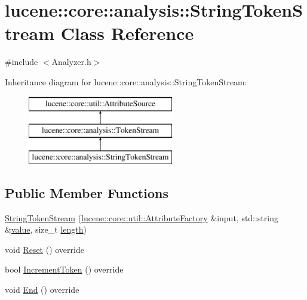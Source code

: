 \hypertarget{classlucene_1_1core_1_1analysis_1_1StringTokenStream}{}\section{lucene\+:\+:core\+:\+:analysis\+:\+:String\+Token\+Stream Class Reference}
\label{classlucene_1_1core_1_1analysis_1_1StringTokenStream}


{\ttfamily \#include $<$Analyzer.\+h$>$}

Inheritance diagram for lucene\+:\+:core\+:\+:analysis\+:\+:String\+Token\+Stream\+:\begin{figure}[H]
\begin{center}
\leavevmode
\includegraphics[height=3.000000cm]{classlucene_1_1core_1_1analysis_1_1StringTokenStream}
\end{center}
\end{figure}
\subsection*{Public Member Functions}
\begin{DoxyCompactItemize}
\item 
\mbox{\hyperlink{classlucene_1_1core_1_1analysis_1_1StringTokenStream_a413ff02bcf7a9f2d617f9e25021f9a44}{String\+Token\+Stream}} (\mbox{\hyperlink{classlucene_1_1core_1_1util_1_1AttributeFactory}{lucene\+::core\+::util\+::\+Attribute\+Factory}} \&input, std\+::string \&\mbox{\hyperlink{classlucene_1_1core_1_1analysis_1_1StringTokenStream_a6fb3e249a092b3cd9b008449d256b6a8}{value}}, size\+\_\+t \mbox{\hyperlink{classlucene_1_1core_1_1analysis_1_1StringTokenStream_ad16af1e525efb086aac50b843f80b418}{length}})
\item 
void \mbox{\hyperlink{classlucene_1_1core_1_1analysis_1_1StringTokenStream_ab578e75921eb1757b4a8887cf29fe94d}{Reset}} () override
\item 
bool \mbox{\hyperlink{classlucene_1_1core_1_1analysis_1_1StringTokenStream_a059da09c86bcf50a286803cad1b99d10}{Increment\+Token}} () override
\item 
void \mbox{\hyperlink{classlucene_1_1core_1_1analysis_1_1StringTokenStream_aabf9a873c934aff5c359417488f33849}{End}} () override
\end{DoxyCompactItemize}
